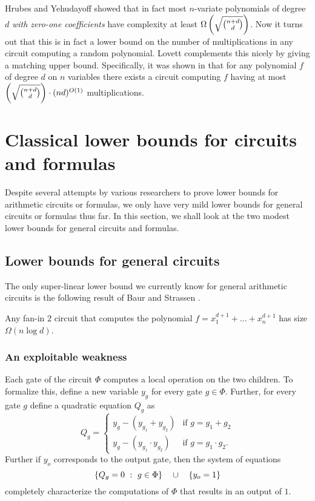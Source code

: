 \documentclass[12pt]{report}
\begin{document}
\noindent	Hrubes and Yehudayoff \cite {hy11} showed that in fact 
	most $n$-variate polynomials of degree $d$ {\em with zero-one 
	coefficients} have complexity at least $\Omega\left(\sqrt{\binom{n+d}{d}}\right)$. 
	Now it turns out that this is in fact a lower bound on the 
	number of multiplications in any circuit computing a random 
	polynomial. Lovett \cite{lovett11} complements this 
	nicely by giving a matching upper bound. Specifically, 
	it was shown in \cite{lovett11} that for any polynomial $f$ 
	of degree $d$ on $n$ variables there exists a circuit computing 
	$f$ having at most $\left(\sqrt{\binom{n + d}{d}}\right) \cdot (nd)^{O(1)} $ 
	multiplications.

\chapter{Classical lower bounds for circuits and formulas}
\label{chap:gen-ckt-formulas}

Despite several attempts by various researchers to prove lower bounds for arithmetic circuits or formulas, we only have very mild lower bounds for general circuits or formulas thus far. In this section, we shall look at the two  modest lower bounds for general circuits and formulas. 

\section{Lower bounds for general circuits}\label{sec:baur-strassen}

The only super-linear lower bound we currently know for general arithmetic circuits is the following  result of Baur and Strassen \cite{BS83}.

\begin{theorem}[\cite{BS83}]\label{thm:baur-strassen}
  Any fan-in $2$ circuit that computes the polynomial $f = x_1^{d+1} + \dots + x_n^{d+1}$ has size $\Omega(n\log d)$. 
\end{theorem}

\subsection{An exploitable weakness}

Each gate of the circuit $\Phi$ computes a local operation on the two children. To formalize this, define a new variable $y_g$ for every gate $g \in \Phi$. Further, for every gate $g$ define a quadratic equation $Q_g$ as
$$
Q_g = \begin{cases} y_g - (y_{g_1} + y_{g_2}) & \text{if $g = g_1 + g_2$}\\
  y_g - (y_{g_1}\cdot y_{g_2}) & \text{if $g = g_1 \cdot g_2$}.
\end{cases}
$$
Further if $y_o$  corresponds to the output gate, then the system of equations
$$\left\{{Q_g = 0}\ : \ {g\in \Phi}\right\} \quad \cup \quad \left\{y_{o} = 1\right\}$$
completely characterize the computations of $\Phi$ that results in an output of $1$. 
\end{document}
